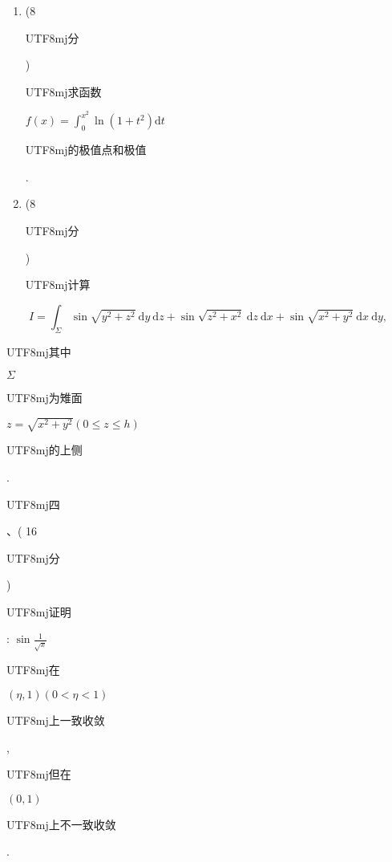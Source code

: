 \documentclass[10pt]{article}
\begin{document}
\begin{enumerate}
  \item (8 \begin{CJK}{UTF8}{mj}分\end{CJK}) \begin{CJK}{UTF8}{mj}求函数\end{CJK} $f(x)=\int_{0}^{x^{2}} \ln \left(1+t^{2}\right) \mathrm{d} t$ \begin{CJK}{UTF8}{mj}的极值点和极值\end{CJK}.

  \item (8 \begin{CJK}{UTF8}{mj}分\end{CJK}) \begin{CJK}{UTF8}{mj}计算\end{CJK}

\end{enumerate}
$$
I=\int_{\Sigma} \sin \sqrt{y^{2}+z^{2}} \mathrm{~d} y \mathrm{~d} z+\sin \sqrt{z^{2}+x^{2}} \mathrm{~d} z \mathrm{~d} x+\sin \sqrt{x^{2}+y^{2}} \mathrm{~d} x \mathrm{~d} y,
$$
\begin{CJK}{UTF8}{mj}其中\end{CJK} $\Sigma$ \begin{CJK}{UTF8}{mj}为雉面\end{CJK} $z=\sqrt{x^{2}+y^{2}}(0 \leqslant z \leqslant h)$ \begin{CJK}{UTF8}{mj}的上侧\end{CJK}.

\begin{CJK}{UTF8}{mj}四\end{CJK}、( 16 \begin{CJK}{UTF8}{mj}分\end{CJK}) \begin{CJK}{UTF8}{mj}证明\end{CJK}: $\sin \frac{1}{\sqrt{x}}$ \begin{CJK}{UTF8}{mj}在\end{CJK} $(\eta, 1)(0<\eta<1)$ \begin{CJK}{UTF8}{mj}上一致收敛\end{CJK}, \begin{CJK}{UTF8}{mj}但在\end{CJK} $(0,1)$ \begin{CJK}{UTF8}{mj}上不一致收敛\end{CJK}.
\end{document}
